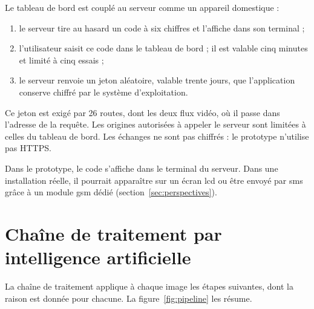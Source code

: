 Le tableau de bord est couplé au serveur comme un appareil domestique :
\begin{enumerate}
  \item le serveur tire au hasard un code à six chiffres et l'affiche dans son terminal ;
  \item l'utilisateur saisit ce code dans le tableau de bord ; il est valable cinq minutes et limité à cinq essais ;
  \item le serveur renvoie un jeton aléatoire, valable trente jours, que l'application conserve chiffré par le système d'exploitation.
\end{enumerate}
Ce jeton est exigé par 26 routes, dont les deux flux vidéo, où il passe dans l'adresse de la requête. Les origines autorisées à appeler le serveur sont limitées à celles du tableau de bord. Les échanges ne sont pas chiffrés : le prototype n'utilise pas HTTPS.

\begin{maj}
Dans le prototype, le code s'affiche dans le terminal du serveur. Dans une installation réelle, il pourrait apparaître sur un écran \gls{lcd} ou être envoyé par \gls{sms} grâce à un module \gls{gsm} dédié (section~\ref{sec:perspectives}).
\end{maj}

\section{Chaîne de traitement par intelligence artificielle}

La chaîne de traitement applique à chaque image les étapes suivantes, dont la raison est donnée pour chacune. La figure~\ref{fig:pipeline} les résume.

